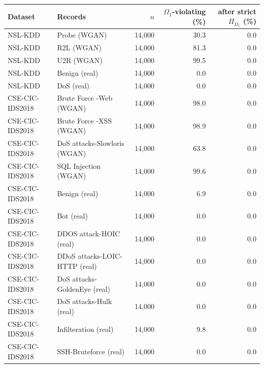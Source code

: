 \begin{tabular}{@{}llrrr@{}}
\toprule
Dataset & Records & $n$ & $\Omega_1$-violating (\%) & after strict $\Pi_{\Omega_1}$ (\%)\\
\midrule
NSL-KDD & Probe (WGAN) & 14,000 & 30.3 & 0.0\\
NSL-KDD & R2L (WGAN) & 14,000 & 81.3 & 0.0\\
NSL-KDD & U2R (WGAN) & 14,000 & 99.5 & 0.0\\
NSL-KDD & Benign (real) & 14,000 & 0.0 & 0.0\\
NSL-KDD & DoS (real) & 14,000 & 0.0 & 0.0\\
\midrule
CSE-CIC-IDS2018 & Brute Force -Web (WGAN) & 14,000 & 98.0 & 0.0\\
CSE-CIC-IDS2018 & Brute Force -XSS (WGAN) & 14,000 & 98.9 & 0.0\\
CSE-CIC-IDS2018 & DoS attacks-Slowloris (WGAN) & 14,000 & 63.8 & 0.0\\
CSE-CIC-IDS2018 & SQL Injection (WGAN) & 14,000 & 99.6 & 0.0\\
CSE-CIC-IDS2018 & Benign (real) & 14,000 & 6.9 & 0.0\\
CSE-CIC-IDS2018 & Bot (real) & 14,000 & 0.0 & 0.0\\
CSE-CIC-IDS2018 & DDOS attack-HOIC (real) & 14,000 & 0.0 & 0.0\\
CSE-CIC-IDS2018 & DDoS attacks-LOIC-HTTP (real) & 14,000 & 0.0 & 0.0\\
CSE-CIC-IDS2018 & DoS attacks-GoldenEye (real) & 14,000 & 0.0 & 0.0\\
CSE-CIC-IDS2018 & DoS attacks-Hulk (real) & 14,000 & 0.0 & 0.0\\
CSE-CIC-IDS2018 & Infilteration (real) & 14,000 & 9.8 & 0.0\\
CSE-CIC-IDS2018 & SSH-Bruteforce (real) & 14,000 & 0.0 & 0.0\\
\bottomrule
\end{tabular}
